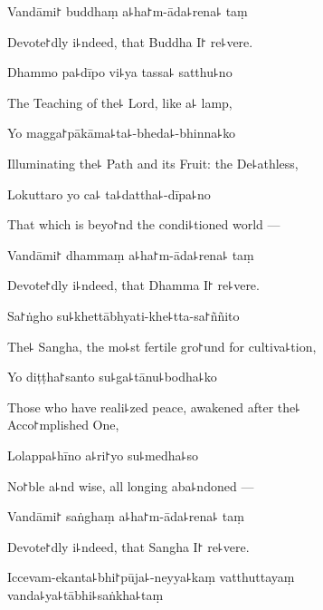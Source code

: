 Vandāmi꜓ buddhaṃ a꜕ha꜓m-āda꜕rena꜕ taṃ

\begin{english}
  Devote꜓dly i꜕ndeed, that Buddha I꜓ re꜕vere.
\end{english}

Dhammo pa꜕dīpo vi꜕ya tassa꜕ satthu꜕no

\begin{english}
  The Teaching of the꜕ Lord, like a꜕ lamp,
\end{english}

Yo magga꜓pākāma꜕ta꜕-bheda꜕-bhinna꜕ko

\begin{english}
  Illuminating the꜕ Path and its Fruit: the De꜕athless,
\end{english}

Lokuttaro yo ca꜕ ta꜕dattha꜕-dīpa꜕no

\begin{english}
  That which is beyo꜓nd the condi꜕tioned world ---
\end{english}

Vandāmi꜓ dhammaṃ a꜕ha꜓m-āda꜕rena꜕ taṃ

\begin{english}
  Devote꜓dly i꜕ndeed, that Dhamma I꜓ re꜕vere.
\end{english}

Sa꜓ṅgho su꜕khettābhyati-khe꜕tta-sa꜓ññito

\begin{english}
  The꜕ Sangha, the mo꜕st fertile gro꜓und for cultiva꜕tion,
\end{english}

Yo diṭṭha꜓santo su꜕ga꜕tānu꜕bodha꜕ko

\begin{english}
  Those who have reali꜕zed peace, awakened after the꜕ \\Acco꜓mplished One,
\end{english}

Lolappa꜕hīno a꜕ri꜓yo su꜕medha꜕so

\begin{english}
  No꜓ble a꜕nd wise, all longing aba꜕ndoned ---
\end{english}

Vandāmi꜓ saṅghaṃ a꜕ha꜓m-āda꜕rena꜕ taṃ

\begin{english}
  Devote꜓dly i꜕ndeed, that Sangha I꜓ re꜕vere.
\end{english}

Iccevam-ekanta꜕bhi꜓pūja꜕-neyya꜕kaṃ vatthuttayaṃ \\vanda꜕ya꜕tābhi꜕saṅkha꜕taṃ

